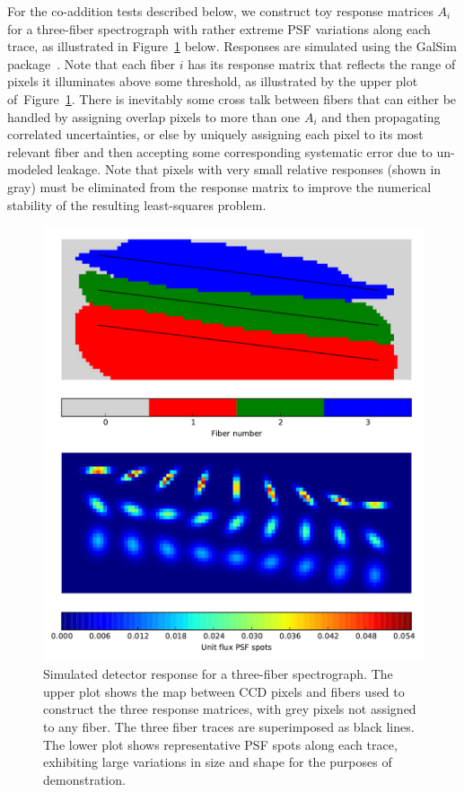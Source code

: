 \documentclass[12pt]{article}
\providecommand{\fig}[1]{Figure~\ref{fig:#1}}
\begin{document}
For the co-addition tests described below, we construct toy response matrices $A_i$ for a three-fiber spectrograph with rather extreme PSF variations along each trace, as illustrated in \fig{detector} below. Responses are simulated using the GalSim package~\cite{2014arXiv1407.7676R}. Note that each fiber $i$ has its response matrix that reflects the range of pixels it illuminates above some threshold, as illustrated by the upper plot of~\fig{detector}.  There is inevitably some cross talk between fibers that can either be handled by assigning overlap pixels to more than one $A_i$ and then propagating correlated uncertainties, or else by uniquely assigning each pixel to its most relevant fiber and then accepting some corresponding systematic error due to un-modeled leakage. Note that pixels with very small relative responses (shown in gray) must be eliminated from the response matrix to improve the numerical stability of the resulting least-squares problem.

\begin{figure}[htb]
\begin{center}
\includegraphics[width=5in]{fig/detector}
\caption{Simulated detector response for a three-fiber spectrograph. The upper plot shows the map between CCD pixels and fibers used to construct the three response matrices, with grey pixels not assigned to any fiber. The three fiber traces are superimposed as black lines. The lower plot shows representative PSF spots along each trace, exhibiting large variations in size and shape for the purposes of demonstration.}
\label{fig:detector}
\end{center}
\end{figure}
\end{document}
